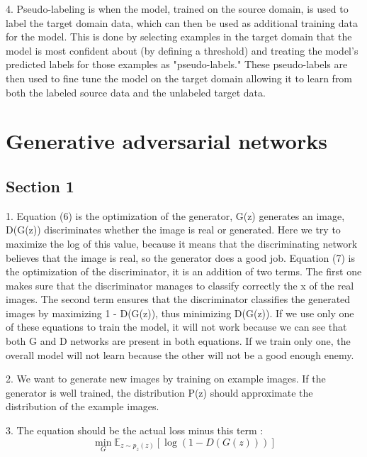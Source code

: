 4. Pseudo-labeling is when the model, trained on the source domain, is used to label the target domain data, which can then be used as additional training data for the model. This is done by selecting examples in the target domain that the model is most confident about (by defining a threshold) and treating the model's predicted labels for those examples as "pseudo-labels." These pseudo-labels are then used to fine tune the model on the target domain allowing it to learn from both the labeled source data and the unlabeled target data.

\section{Generative adversarial networks}

\subsection{Section 1}

1. Equation (6) is the optimization of the generator, G(z) generates an image, D(G(z)) discriminates whether the image is real or generated. Here we try to maximize the log of this value, because it means that the discriminating network believes that the image is real, so the generator does a good job.
Equation (7) is the optimization of the discriminator, it is an addition of two terms. The first one makes sure that the discriminator manages to classify correctly the x of the real images. The second term ensures that the discriminator classifies the generated images by maximizing 1 - D(G(z)), thus minimizing D(G(z)).
If we use only one of these equations to train the model, it will not work because we can see that both G and D networks are present in both equations. If we train only one, the overall model will not learn because the other will not be a good enough enemy.

2. We want to generate new images by training on example images. If the generator is well trained, the distribution P(z) should approximate the distribution of the example images.

3. The equation should be the actual loss minus this term : $$\min_G \mathbb{E}_{z \sim p_z(z)}[\log(1-D(G(z)))]$$

